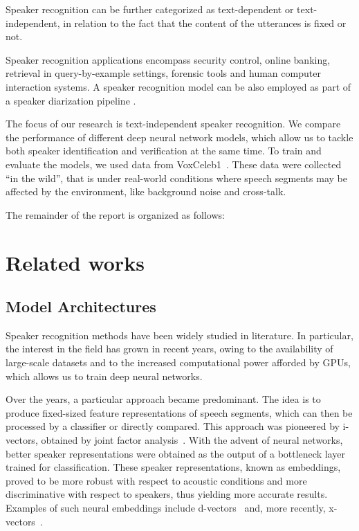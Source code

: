 \documentclass[conference]{IEEEtran}
\begin{document}
Speaker recognition can be further categorized as text-dependent or text-independent, in relation to the fact that the content of the utterances is fixed or not.

Speaker recognition applications encompass security control, online banking, retrieval in query-by-example settings, forensic tools and human computer interaction systems. A speaker recognition model can be also employed as part of a speaker diarization pipeline \cite{chung2018voxceleb2,park2022review}.

The focus of our research is text-independent speaker recognition. We compare the performance of different deep neural network models, which allow us to tackle both speaker identification and verification at the same time. To train and evaluate the models, we used data from VoxCeleb1~\cite{nagrani2020voxceleb}. These data were collected ``in the wild'', that is under real-world conditions where speech segments may be affected by the environment, like background noise and cross-talk.

The remainder of the report is organized as follows:


\section{Related works}

\subsection{Model Architectures}

Speaker recognition methods have been widely studied in literature. In particular, the interest in the field has grown in recent years, owing to the availability of large-scale datasets and to the increased computational power afforded by GPUs, which allows us to train deep neural networks.

Over the years, a particular approach became predominant. The idea is to produce fixed-sized feature representations of speech segments, which can then be processed by a classifier or directly compared. This approach was pioneered by i-vectors, obtained by joint factor analysis~\cite{dehak2011ivectors}. With the advent of neural networks, better speaker representations were obtained as the output of a bottleneck layer trained for classification. These speaker representations, known as embeddings, proved to be more robust with respect to acoustic conditions and more discriminative with respect to speakers, thus yielding more accurate results. Examples of such neural embeddings include d-vectors~\cite{variani2014dvectors} and, more recently, x-vectors~\cite{snyder2017deep,snyder2018xvectors}.
\end{document}
